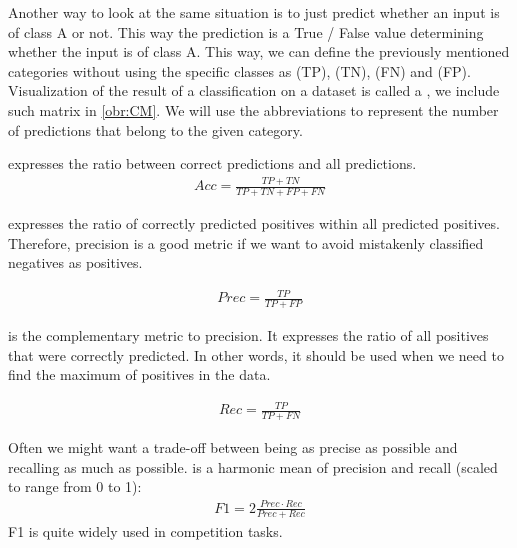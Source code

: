 Another way to look at the same situation is to just predict whether an input is of class A or not. This way the prediction is a True / False value determining whether the input is of class A. This way, we can define the previously mentioned categories without using the specific classes as  (TP),  (TN),  (FN) and  (FP). Visualization of the result of a classification on a dataset is called a , we include such matrix in \autoref{obr:CM}. We will use the abbreviations to represent the number of predictions that belong to the given category.  



 expresses the ratio between correct predictions and all predictions.
\begin{align}
Acc = \frac{TP+TN}{TP+TN+FP+FN}
\end{align} 



 expresses the ratio of correctly predicted positives within all predicted positives. Therefore, precision is a good metric if we want to avoid mistakenly classified negatives as positives.

\begin{align} 
Prec = \frac{TP}{TP + FP}
\end{align}

 is the complementary metric to precision. It expresses the ratio of all positives that were correctly predicted. In other words, it should be used when we need to find the maximum of positives in the data.

\begin{align}
Rec = \frac{TP}{TP + FN}
\end{align}

Often we might want a trade-off between being as precise as possible and recalling as much as possible.  is a harmonic mean of precision and recall (scaled to range from 0 to 1): \begin{align}
F1 = 2\frac{Prec \cdot Rec}{Prec + Rec}
\end{align}
F1 is quite widely used in competition tasks.



